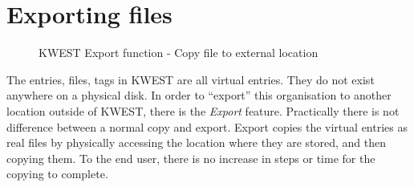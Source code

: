 \section{Exporting files}
\begin{figure}[htb]
\centering
\setlength\fboxsep{0pt}
\setlength\fboxrule{0.5pt}
\caption{KWEST Export function - Copy file to external location}
\label{fig:dfd0}
\end{figure}
The entries, files, tags in KWEST are all virtual entries. They do not exist anywhere on a physical disk. In order to ``export'' this organisation to another location outside of KWEST, there is the \emph{Export} feature. Practically there is not difference between a normal copy and export. Export copies the virtual entries as real files by physically accessing the location where they are stored, and then copying them. To the end user, there is no increase in steps or time for the copying to complete.